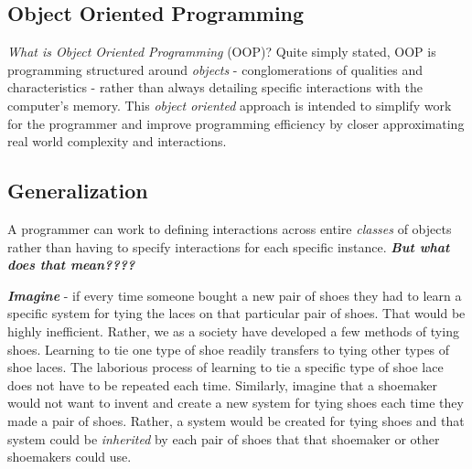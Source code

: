 \documentclass{article}
\begin{document}
\begin{flushleft}
  \section{Object Oriented Programming}
  \emph{What is Object Oriented Programming} (OOP)? Quite simply stated, OOP is programming structured around \emph{objects} - conglomerations of qualities and characteristics - rather than always detailing specific interactions with the computer's memory. This \emph{object oriented} approach is intended to simplify work for the programmer and improve programming efficiency by closer approximating real world complexity and interactions.\par
  \subsection{Generalization}
  A programmer can work to defining interactions across entire \emph{classes} of objects rather than having to specify interactions for each specific instance. \textbf{\emph{But what does that mean????}}\par
  \emph{\textbf{Imagine}} - if every time someone bought a new pair of shoes they had to learn a specific system for tying the laces on that particular pair of shoes. That would be highly inefficient. Rather, we as a society have developed a few methods of tying shoes. Learning to tie one type of shoe readily transfers to tying other types of shoe laces. The laborious process of learning to tie a specific type of shoe lace does not have to be repeated each time. Similarly, imagine that a shoemaker would not want to invent and create a new system for tying shoes each time they made a pair of shoes. Rather, a system would be created for tying shoes and that system could be \emph{inherited} by each pair of shoes that that shoemaker or other shoemakers could use. \par

\end{flushleft}
\end{document}

